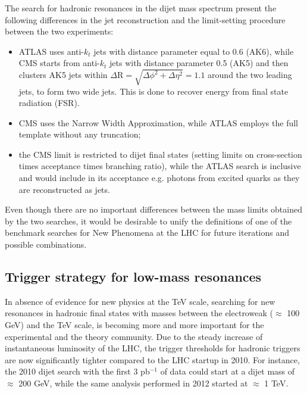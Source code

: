 \documentclass{PoS}
\newcommand{\antikt}{anti-$k_t$}
\begin{document}
The search for hadronic resonances in the dijet mass spectrum present 
the following differences in the jet reconstruction and the limit-setting procedure between the two experiments:
\begin{itemize}
\item ATLAS uses \antikt{} jets with distance parameter equal to 0.6 (AK6), while 
CMS starts from  \antikt{} jets with distance parameter 0.5
(AK5) and then clusters AK5 jets within $\Delta\mbox{R}=\sqrt{\Delta\phi^2+\Delta\eta^2}=1.1$ around the two leading jets, to form two wide jets. This is done to recover energy from final 
state radiation (FSR).
 \item CMS uses the Narrow Width Approximation, while ATLAS employs the full template without any truncation;
 \item the CMS limit is restricted to dijet final states (setting limits on cross-section times acceptance times branching ratio), while the ATLAS search is inclusive and would include in its acceptance e.g. photons from excited quarks as they are reconstructed as jets. 
\end{itemize}
Even though there are no important differences between the mass limits obtained by the two searches, 
it would be desirable to unify the definitions of one of the benchmark searches for New Phenomena at the LHC
for future iterations and possible combinations. 

\subsection{Trigger strategy for low-mass resonances}
In absence of evidence for new physics at the TeV scale, 
searching for new resonances in hadronic final states with masses 
between the electroweak ($\approx$ 100 GeV) and the TeV scale, 
is becoming more and more important for the experimental and the theory community.
Due to the steady increase of instantaneous luminosity of the LHC, 
the trigger thresholds for hadronic triggers are now significantly 
tighter compared to the LHC startup in 2010. For instance, the 2010 
dijet search with the first  3 pb$^{-1}$ of data could start at a dijet mass 
of $\approx$ 200 GeV, while the same analysis performed in 2012 
started at $\approx$ 1 TeV.
\end{document}
